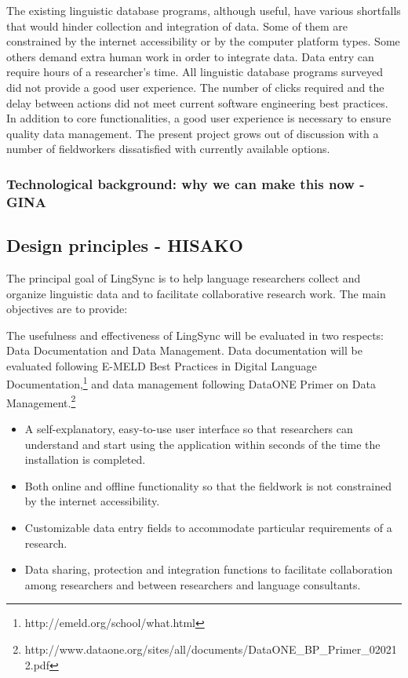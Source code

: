 \documentclass[letterpaper, 12pt, dvips]{mitwpl}
\begin{document}
The existing linguistic database programs, although useful, have various shortfalls
that would hinder collection and integration of data. Some of them are constrained by
the internet accessibility or by the computer platform types. Some others demand extra
human work in order to integrate data. Data entry can require hours of a researcher's
time. All linguistic database programs surveyed did not provide a good user experience.
The number of clicks required and the delay between actions did not meet current
software engineering best practices. In addition to core functionalities, a good user
experience is necessary to ensure quality data management. The present project grows
out of discussion with a number of fieldworkers dissatisfied with currently available
options.


\subsubsection{Technological background: why we can make this now - GINA} 

\subsection{Design principles - HISAKO} 
\label{sec:design}

The principal goal of LingSync is to help language researchers collect and organize linguistic data and to facilitate collaborative research work. The main objectives are to provide: 


The usefulness and effectiveness of LingSync will be evaluated in two respects: Data Documentation and Data Management. Data documentation will be evaluated following E-MELD Best Practices in Digital Language Documentation,\footnote{http://emeld.org/school/what.html} and data management following DataONE Primer on Data Management.\footnote{http://www.dataone.org/sites/all/documents/DataONE\_BP\_Primer\_020212.pdf}


\begin{itemize} 
\item A self-explanatory, easy-to-use user interface so that researchers can understand and start using the application  within seconds of  the time the installation is completed.  
\item Both online and offline functionality so that the fieldwork is not constrained by the internet accessibility. 
\item Customizable data entry fields to accommodate particular requirements of a research.  
\item Data sharing, protection and integration functions to facilitate collaboration among researchers and between researchers and language consultants. 

\end{itemize} 
\end{document}
